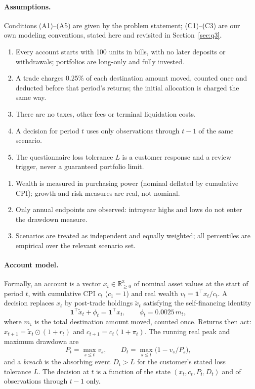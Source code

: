 \documentclass[11pt,a4paper]{article}
\begin{document}
\paragraph{Assumptions.}
Conditions (A1)--(A5) are given by the problem statement; (C1)--(C3) are our own
modeling conventions, stated here and revisited in Section~\ref{sec:q3}.
\begin{enumerate}[leftmargin=1.6em,itemsep=0.5pt,label=\textbf{(A\arabic*)}]
\item Every account starts with 100 units in bills, with no later deposits or
withdrawals; portfolios are long-only and fully invested.
\item A trade charges 0.25\% of each destination amount moved, counted once and
deducted before that period's returns; the initial allocation is charged the
same way.
\item There are no taxes, other fees or terminal liquidation costs.
\item A decision for period $t$ uses only observations through $t-1$ of the
same scenario.
\item The questionnaire loss tolerance $L$ is a customer response and a review
trigger, never a guaranteed portfolio limit.
\end{enumerate}
\begin{enumerate}[leftmargin=1.6em,itemsep=0.5pt,label=\textbf{(C\arabic*)}]
\item Wealth is measured in purchasing power (nominal deflated by cumulative
CPI); growth and risk measures are real, not nominal.
\item Only annual endpoints are observed: intrayear highs and lows do not enter
the drawdown measure.
\item Scenarios are treated as independent and equally weighted; all
percentiles are empirical over the relevant scenario set.
\end{enumerate}

\paragraph{Account model.}
Formally, an account is a vector $x_t\in\mathbb{R}_{\ge0}^3$ of nominal asset
values at the start of period $t$, with cumulative CPI $c_t$ ($c_1=1$) and real
wealth $v_t=\mathbf{1}^{\top}x_t/c_t$. A decision replaces $x_t$ by post-trade
holdings $\tilde x_t$ satisfying the self-financing identity
\begin{equation}
\mathbf{1}^{\top}\tilde x_t+\phi_t=\mathbf{1}^{\top}x_t,
\qquad \phi_t=0.0025\,m_t,
\label{eq:account}
\end{equation}
where $m_t$ is the total destination amount moved, counted once. Returns then
act: $x_{t+1}=\tilde x_t\odot(1+r_t)$ and $c_{t+1}=c_t(1+\pi_t)$. The running
real peak and maximum drawdown are
\begin{equation}
P_t=\max_{s\le t}v_s,\qquad D_t=\max_{s\le t}\bigl(1-v_s/P_s\bigr),
\label{eq:mdd}
\end{equation}
and a \emph{breach} is the absorbing event $D_t>L$ for the customer's stated
loss tolerance $L$. The decision at $t$ is a function of the state
$(x_t,c_t,P_t,D_t)$ and of observations through $t-1$ only.
\end{document}
